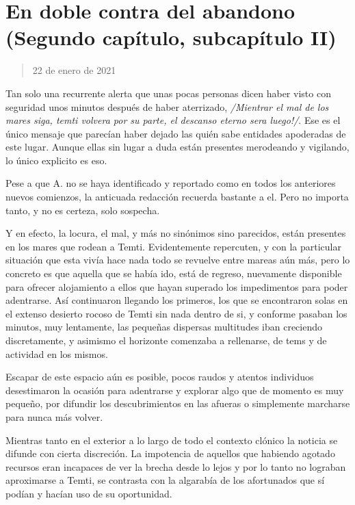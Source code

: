 \documentclass[
  spanish,
]{book}
\begin{document}
\hypertarget{en-doble-contra-del-abandono-segundo-capuxedtulo-subcapuxedtulo-ii}{%
\section{En doble contra del abandono (Segundo capítulo, subcapítulo II)}\label{en-doble-contra-del-abandono-segundo-capuxedtulo-subcapuxedtulo-ii}}

\begin{quote}
22 de enero de 2021
\end{quote}

Tan solo una recurrente alerta que unas pocas personas dicen haber visto con seguridad unos minutos después de haber aterrizado, \emph{/Mientrar el mal de los mares siga, temti volvera por su parte, el descanso eterno sera luego!/}. Ese es el único mensaje que parecían haber dejado las quién sabe entidades apoderadas de este lugar. Aunque ellas sin lugar a duda están presentes merodeando y vigilando, lo único explicito es eso.

Pese a que A. no se haya identificado y reportado como en todos los anteriores nuevos comienzos, la anticuada redacción recuerda bastante a el. Pero no importa tanto, y no es certeza, solo sospecha.

Y en efecto, la locura, el mal, y más no sinónimos sino parecidos, están presentes en los mares que rodean a Temti. Evidentemente repercuten, y con la particular situación que esta vivía hace nada todo se revuelve entre mareas aún más, pero lo concreto es que aquella que se había ido, está de regreso, nuevamente disponible para ofrecer alojamiento a ellos que hayan superado los impedimentos para poder adentrarse. Así continuaron llegando los primeros, los que se encontraron solas en el extenso desierto rocoso de Temti sin nada dentro de si, y conforme pasaban los minutos, muy lentamente, las pequeñas dispersas multitudes iban creciendo discretamente, y asimismo el horizonte comenzaba a rellenarse, de tems y de actividad en los mismos.

Escapar de este espacio aún es posible, pocos raudos y atentos individuos desestimaron la ocasión para adentrarse y explorar algo que de momento es muy pequeño, por difundir los descubrimientos en las afueras o simplemente marcharse para nunca más volver.

Mientras tanto en el exterior a lo largo de todo el contexto clónico la noticia se difunde con cierta discreción. La impotencia de aquellos que habiendo agotado recursos eran incapaces de ver la brecha desde lo lejos y por lo tanto no lograban aproximarse a Temti, se contrasta con la algarabía de los afortunados que sí podían y hacían uso de su oportunidad.
\end{document}
